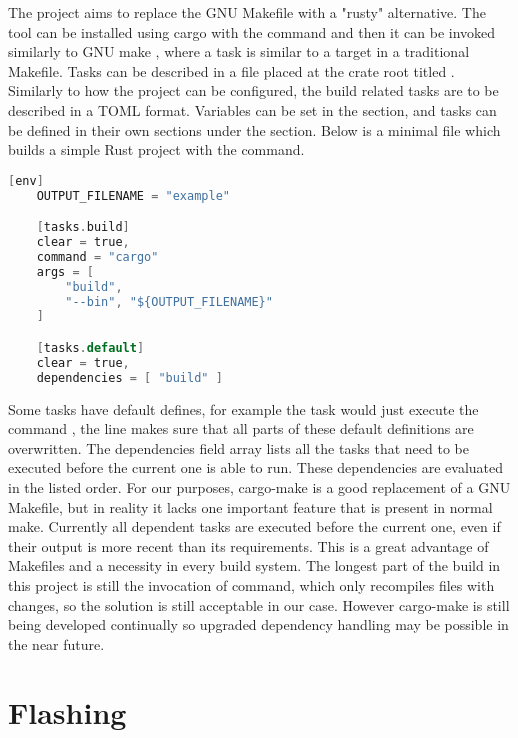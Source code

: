 The  \cite{CargoMake} project aims to replace the GNU Makefile with a "rusty" alternative. The tool can be installed using cargo with the command  and then it can be invoked similarly to GNU make , where a task is similar to a target in a traditional Makefile. Tasks can be described in a file placed at the crate root titled . Similarly to how the project can be configured, the build related tasks are to be described in a TOML format. Variables can be set in the \mycode{[env]} section, and tasks can be defined in their own sections under the  section. Below is a minimal  file which builds a simple Rust project with the  command.

\begin{lstlisting}[language=C,frame=single,float=!ht,label={lst:cargo-task-example},caption={Cargo Make Task Example}]
    [env]
    OUTPUT_FILENAME = "example"

    [tasks.build]
    clear = true,
    command = "cargo"
    args = [
        "build",
        "--bin", "${OUTPUT_FILENAME}"
    ]

    [tasks.default]
    clear = true,
    dependencies = [ "build" ]
\end{lstlisting}

Some tasks have default defines, for example the  task would just execute the command , the  line makes sure that all parts of these default definitions are overwritten. The dependencies field array lists all the tasks that need to be executed before the current one is able to run. These dependencies are evaluated in the listed order. For our purposes, cargo-make is a good replacement of a GNU Makefile, but in reality it lacks one important feature that is present in normal make. Currently all dependent tasks are executed before the current one, even if their output is more recent than its requirements. This is a great advantage of Makefiles and a necessity in every build system. The longest part of the build in this project is still the invocation of  command, which only recompiles files with changes, so the solution is still acceptable in our case. However cargo-make is still being developed continually so upgraded dependency handling may be possible in the near future.

\section{Flashing}

